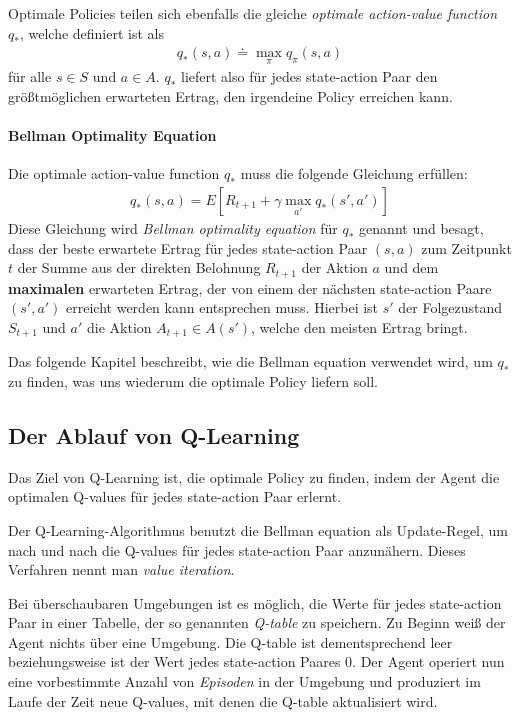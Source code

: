 Optimale Policies teilen sich ebenfalls die gleiche \textit{optimale action-value function} $ q_* $, welche definiert ist als
\begin{align}
    q_*(s, a) \doteq \max_\pi q_\pi(s, a)
\end{align}
für alle $ s \in S $ und $ a \in A $. $ q_* $ liefert also für jedes state-action Paar den größtmöglichen erwarteten Ertrag, den irgendeine Policy erreichen kann.

\paragraph{Bellman Optimality Equation}
Die optimale action-value function $ q_* $ muss die folgende Gleichung erfüllen:
\begin{align}
    q_*(s, a) = E \left[R_{t + 1} + \gamma \max_{a'} q_*(s', a') \right] \label{eq:bellman}
\end{align}
Diese Gleichung wird \textit{Bellman optimality equation} für $ q_* $ genannt und besagt, dass der beste erwartete Ertrag für jedes state-action Paar $ (s, a) $ zum Zeitpunkt $ t $ der Summe aus der direkten Belohnung $ R_{t + 1} $ der Aktion $ a $ und dem \textbf{maximalen} erwarteten Ertrag, der von einem der nächsten state-action Paare $ (s', a') $ erreicht werden kann entsprechen muss. Hierbei ist $ s' $ der Folgezustand $ S_{t + 1} $ und $ a' $ die Aktion $ A_{t + 1} \in A(s') $, welche den meisten Ertrag bringt.

Das folgende Kapitel beschreibt, wie die Bellman equation verwendet wird, um $ q_* $ zu finden, was uns wiederum die optimale Policy liefern soll. 

\subsection{Der Ablauf von Q-Learning} \label{sec:q_learning_process}
Das Ziel von Q-Learning ist, die optimale Policy zu finden, indem der Agent die optimalen Q-values für jedes state-action Paar erlernt.

Der Q-Learning-Algorithmus benutzt die Bellman equation als Update-Regel, um nach und nach die Q-values für jedes state-action Paar anzunähern. Dieses Verfahren nennt man \textit{value iteration}.

Bei überschaubaren Umgebungen ist es möglich, die Werte für jedes state-action Paar in einer Tabelle, der so genannten \textit{Q-table} zu speichern. Zu Beginn weiß der Agent nichts über eine Umgebung. Die Q-table ist dementsprechend leer beziehungsweise ist der Wert jedes state-action Paares 0. Der Agent operiert nun eine vorbestimmte Anzahl von \textit{Episoden} in der Umgebung und produziert im Laufe der Zeit neue Q-values, mit denen die Q-table aktualisiert wird.

